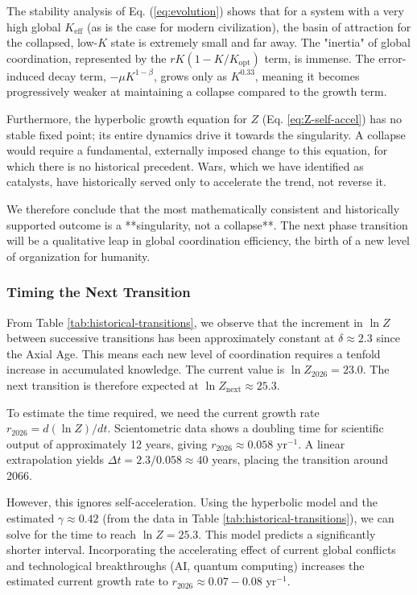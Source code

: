\documentclass[12pt,a4paper]{article}
\theoremstyle{remark}
\begin{document}
	The stability analysis of Eq. (\ref{eq:evolution}) shows that for a system with a very high global $K_{\text{eff}}$ (as is the case for modern civilization), the basin of attraction for the collapsed, low-$K$ state is extremely small and far away. The "inertia" of global coordination, represented by the $rK(1-K/K_{\text{opt}})$ term, is immense. The error-induced decay term, $-\mu K^{1-\beta}$, grows only as $K^{0.33}$, meaning it becomes progressively weaker at maintaining a collapse compared to the growth term.
	
	Furthermore, the hyperbolic growth equation for $Z$ (Eq. \ref{eq:Z-self-accel}) has no stable fixed point; its entire dynamics drive it towards the singularity. A collapse would require a fundamental, externally imposed change to this equation, for which there is no historical precedent. Wars, which we have identified as catalysts, have historically served only to accelerate the trend, not reverse it.
	
	We therefore conclude that the most mathematically consistent and historically supported outcome is a **singularity, not a collapse**. The next phase transition will be a qualitative leap in global coordination efficiency, the birth of a new level of organization for humanity.
	
	\subsubsection{Timing the Next Transition}
	
	From Table \ref{tab:historical-transitions}, we observe that the increment in $\ln Z$ between successive transitions has been approximately constant at $\delta \approx 2.3$ since the Axial Age. This means each new level of coordination requires a tenfold increase in accumulated knowledge. The current value is $\ln Z_{2026} = 23.0$. The next transition is therefore expected at $\ln Z_{\text{next}} \approx 25.3$.
	
	To estimate the time required, we need the current growth rate $r_{2026} = d(\ln Z)/dt$. Scientometric data \cite{Bornmann2015} shows a doubling time for scientific output of approximately 12 years, giving $r_{2026} \approx 0.058$ yr$^{-1}$. A linear extrapolation yields $\Delta t = 2.3 / 0.058 \approx 40$ years, placing the transition around 2066.
	
	However, this ignores self-acceleration. Using the hyperbolic model and the estimated $\gamma \approx 0.42$ (from the data in Table \ref{tab:historical-transitions}), we can solve for the time to reach $\ln Z = 25.3$. This model predicts a significantly shorter interval. Incorporating the accelerating effect of current global conflicts and technological breakthroughs (AI, quantum computing) increases the estimated current growth rate to $r_{2026} \approx 0.07-0.08$ yr$^{-1}$.
	
\end{document}
